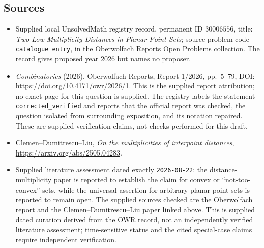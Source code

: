 \documentclass[11pt]{article}
\begin{document}
\subsection{Sources}
\begin{itemize}
\item Supplied local UnsolvedMath registry record, permanent ID \(30006556\), title: \emph{Two Low-Multiplicity Distances in Planar Point Sets}; source problem code \texttt{catalogue entry}, in the Oberwolfach Reports Open Problems collection. The record gives proposed year 2026 but names no proposer.
\item \emph{Combinatorics} (2026), Oberwolfach Reports, Report 1/2026, pp.~5--79, DOI: \url{https://doi.org/10.4171/owr/2026/1}. This is the supplied report attribution; no exact page for this question is supplied. The registry labels the statement \texttt{corrected\_verified} and reports that the official report was checked, the question isolated from surrounding exposition, and its notation repaired. These are supplied verification claims, not checks performed for this draft.
\item Clemen--Dumitrescu--Liu, \emph{On the multiplicities of interpoint distances}, \url{https://arxiv.org/abs/2505.04283}.
\item Supplied literature assessment dated exactly \texttt{2026-08-22}: the distance-multiplicity paper is reported to establish the claim for convex or ``not-too-convex'' sets, while the universal assertion for arbitrary planar point sets is reported to remain open. The supplied sources checked are the Oberwolfach report and the Clemen--Dumitrescu--Liu paper linked above. This is supplied dated curation derived from the OWR record, not an independently verified literature assessment; time-sensitive status and the cited special-case claims require independent verification.
\end{itemize}
\end{document}
